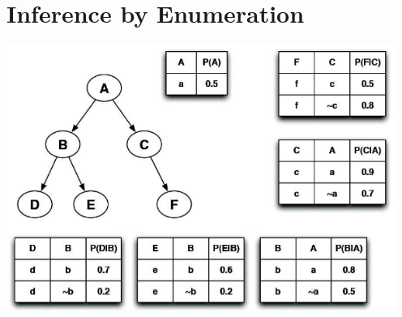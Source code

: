 \documentclass[12pt]{article}
\begin{document}
\clearpage

\section{Inference by Enumeration}

\begin{center}
\includegraphics[width=5in]{prob2.png}
\end{center}
\end{document}

